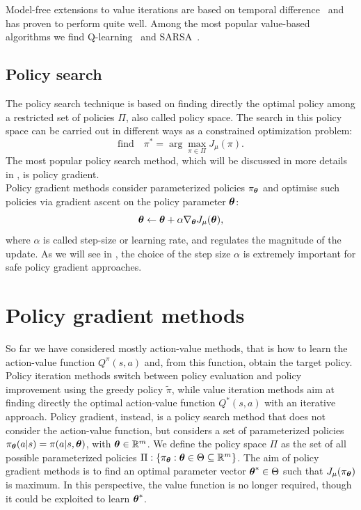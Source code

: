 Model-free extensions to value iterations are based on temporal difference~\cite{Sutton1988} and has proven to perform quite well. Among the most popular value-based algorithms we find Q-learning~\cite{Watkins1992} and SARSA~\cite{sarsa}.


\subsection{Policy search}
The policy search technique is based on finding directly the optimal policy among a restricted set of policies $\Pi$, also called policy space. The search in this policy space can be carried out in different ways as a constrained optimization problem:
\[
\textrm{find}\quad \pi^* = \arg\max_{\pi\in\Pi}J_\mu(\pi).
\]
The most popular policy search method, which will be discussed in more details in , is policy gradient.\\
Policy gradient methods consider parameterized policies $\pi_{{\boldsymbol{\theta}}}$ and optimise such policies via gradient ascent on the policy parameter ${\boldsymbol{\theta}}$:
\[
{\boldsymbol{\theta}} \gets {\boldsymbol{\theta}} + \alpha\nabla_{{\boldsymbol{\theta}}}J_\mu({\boldsymbol{\theta}}),
\]
where $\alpha$ is called step-size or learning rate, and regulates the magnitude of the update. As we will see in , the choice of the step size $\alpha$ is extremely important for safe policy gradient approaches.

\section{Policy gradient methods}
\label{sec:policy-gradient}

So far we have considered mostly action-value methods, that is how to learn the action-value function $Q^\pi(s,a)$ and, from this function, obtain the target policy. Policy iteration methods switch between policy evaluation and policy improvement using the greedy policy $\tilde{\pi}$, while value iteration methods aim at finding directly the optimal action-value function $Q^*(s,a)$ with an iterative approach. Policy gradient, instead, is a policy search method that does not consider the action-value function, but considers a set of parameterized policies $\pi_{{\boldsymbol{\theta}}}(a|s)=\pi(a|s,{\boldsymbol{\theta}})$, with ${\boldsymbol{\theta}}\in\mathbb{R}^m$. We define the policy space $\Pi$ as the set of all possible parameterized policies $\Pi:\left\{\pi_{{\boldsymbol{\theta}}} : {\boldsymbol{\theta}}\in\Theta \subseteq \mathbb{R}^m\right\}$. The aim of policy gradient methods is to find an optimal parameter vector ${\boldsymbol{\theta}}^*\in\Theta$ such that $J_\mu(\pi_{{\boldsymbol{\theta}}})$ is maximum. In this perspective, the value function is no longer required, though it could be exploited to learn ${\boldsymbol{\theta}}^*$.

